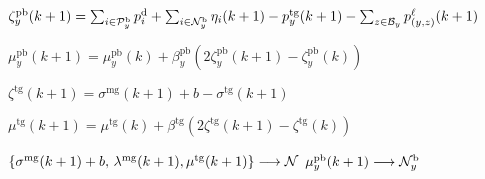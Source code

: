 \begin{algorithm*}[htbp]
\begin{algorithmic}[1]
\State
$\zeta^{\text{pb}}_y(k+1)   = \sum_{i \in \mathcal P_y^{\mathrm{b}}} p_i^{\mathrm{d}} + \sum_{i \in \mathcal N_y^{\mathrm{b}}} \eta_i(k+1)- p^{\text{tg}}_y(k+1) - \sum_{z \in \mathcal B_y} p^\ell_{(y,z)} (k+1)$

\State
$\mu_y^{\text{pb}}(k+1) = \mu_y^{\text{pb}}(k) + \beta^{\text{pb}}_y (2 \zeta^{\text{pb}}_y(k+1)- \zeta^{\text{pb}}_y(k))$
\EndFor

\State
$\zeta^{\text{tg}}(k+1) = \sigma^{\text{mg}}
	(k+1)+b- \sigma^{\text{tg}}(k+1)$

\State
$\mu^{\text{tg}}(k+1) = \mu^{\text{tg}}(k) + \beta^{\text{tg}} (2\zeta^{\text{tg}}(k+1)-\zeta^{\text{tg}}(k))$
\EndDual	

\State
$ \{ \sigma^{\mathrm{mg}}(k+1)+b, \, \lambda^{\text{mg}}(k+1), \mu^{\text{tg}}(k+1) \} 
	\longrightarrow  \mathcal N$
\State
$\mu^{\text{pb}}_y(k+1)\longrightarrow \mathcal N_y^{\mathrm{b}}$
\EndFor

\EndComm

\EndDNO	

\EndIUC	

\end{algorithmic}
\end{algorithm*}

